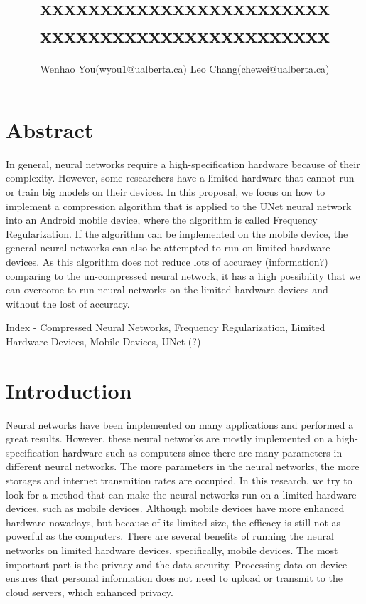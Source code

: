 \documentclass{article}
\title{xxxxxxxxxxxxxxxxxxxxxxxx xxxxxxxxxxxxxxxxxxxxxxxx}
\author{Wenhao You(wyou1@ualberta.ca) Leo Chang(chewei@ualberta.ca)}
\date{}
\begin{document}
	\maketitle
	
	
	
	
	
	
	\section*{Abstract}

In general, neural networks require a high-specification hardware because of their complexity. However, some researchers have a limited hardware that cannot run or train big models on their devices. In this proposal, we focus on how to implement a compression algorithm that is applied to the UNet neural network into an Android mobile device, where the algorithm is called Frequency Regularization. If the algorithm can be implemented on the mobile device, the general neural networks can also be attempted to run on limited hardware devices. As this algorithm does not reduce lots of accuracy (information?) comparing to the un-compressed neural network, it has a high possibility that we can overcome to run neural networks on the limited hardware devices and without the lost of accuracy.

Index - Compressed Neural Networks, Frequency Regularization, Limited Hardware Devices, Mobile Devices, UNet (?)


	\section*{Introduction}
	
Neural networks have been implemented on many applications and performed a great results. However, these neural networks are mostly implemented on a high-specification hardware such as computers since there are many parameters in different neural networks. The more parameters in the neural networks, the more storages and internet transmition rates are occupied. In this research, we try to look for a method that can make the neural networks run on a limited hardware devices, such as mobile devices. Although mobile devices have more enhanced hardware nowadays, but because of its limited size, the efficacy is still not as powerful as the computers. There are several benefits of running the neural networks on limited hardware devices, specifically, mobile devices. The most important part is the privacy and the data security. Processing data on-device ensures that personal information does not need to upload or transmit to the cloud servers, which enhanced privacy. 
\end{document}
